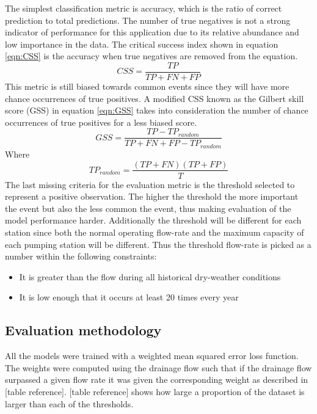 The simplest classification metric is accuracy, which is the ratio of correct prediction to total predictions. The number of true negatives is not a strong indicator of performance for this application due to its relative abundance and low importance in the data. The critical success index shown in equation \ref{eqn:CSS} is the accuracy when true negatives are removed from the equation.
\begin{equation}
\label{eqn:CSS}
CSS = \frac{TP}{TP + FN + FP}
\end{equation}This metric is still biased towards common events since they will have more chance occurrences of true positives. A modified CSS known as the Gilbert skill score (GSS) in equation \ref{eqn:GSS} takes into consideration the number of chance occurrences of true positives for a less biased score.
\begin{equation}
\label{eqn:GSS}
GSS = \frac{TP - TP_{random}}{TP + FN + FP - TP_{random}}
\end{equation}
Where
\begin{equation}
\label{eqn:TPrandom}
TP_{random} = \frac{(TP + FN)(TP + FP)}{T}
\end{equation}The last missing criteria for the evaluation metric is the threshold selected to represent a positive observation. The higher the threshold the more important the event but also the less common the event, thus making evaluation of the model performance harder. Additionally the threshold will be different for each station since both the normal operating flow-rate and the maximum capacity of each pumping station will be different. Thus the threshold flow-rate is picked as a number within the following constraints:
\begin{itemize}
\item It is greater than the flow during all historical dry-weather conditions
\item It is low enough that it occurs at least 20 times every year
\end{itemize}





\subsection{Evaluation methodology}
All the models were trained with a weighted mean squared error loss function. The weights were computed using the drainage flow such that if the drainage flow surpassed a given flow rate it was given the corresponding weight as described in [table reference]. [table reference] shows how large a proportion of the dataset is larger than each of the thresholds. 

